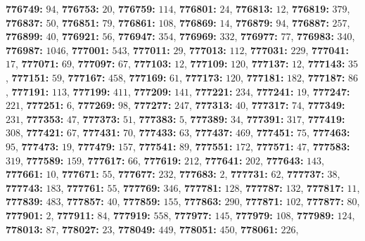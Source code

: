 \textsf{\bfseries 776749:} $94$, \textsf{\bfseries 776753:} $20$, \textsf{\bfseries 776759:} $114$, \textsf{\bfseries 776801:} $24$, \textsf{\bfseries 776813:} $12$, \textsf{\bfseries 776819:} $379$, \textsf{\bfseries 776837:} $50$, \textsf{\bfseries 776851:} $79$, \textsf{\bfseries 776861:} $108$, \textsf{\bfseries 776869:} $14$, \textsf{\bfseries 776879:} $94$, \textsf{\bfseries 776887:} $257$, \textsf{\bfseries 776899:} $40$, \textsf{\bfseries 776921:} $56$, \textsf{\bfseries 776947:} $354$, \textsf{\bfseries 776969:} $332$, \textsf{\bfseries 776977:} $77$, \textsf{\bfseries 776983:} $340$, \textsf{\bfseries 776987:} $1046$, \textsf{\bfseries 777001:} $543$, \textsf{\bfseries 777011:} $29$, \textsf{\bfseries 777013:} $112$, \textsf{\bfseries 777031:} $229$, \textsf{\bfseries 777041:} $17$, \textsf{\bfseries 777071:} $69$, \textsf{\bfseries 777097:} $67$, \textsf{\bfseries 777103:} $12$, \textsf{\bfseries 777109:} $120$, \textsf{\bfseries 777137:} $12$, \textsf{\bfseries 777143:} $35$, \textsf{\bfseries 777151:} $59$, \textsf{\bfseries 777167:} $458$, \textsf{\bfseries 777169:} $61$, \textsf{\bfseries 777173:} $120$, \textsf{\bfseries 777181:} $182$, \textsf{\bfseries 777187:} $86$, \textsf{\bfseries 777191:} $113$, \textsf{\bfseries 777199:} $411$, \textsf{\bfseries 777209:} $141$, \textsf{\bfseries 777221:} $234$, \textsf{\bfseries 777241:} $19$, \textsf{\bfseries 777247:} $221$, \textsf{\bfseries 777251:} $6$, \textsf{\bfseries 777269:} $98$, \textsf{\bfseries 777277:} $247$, \textsf{\bfseries 777313:} $40$, \textsf{\bfseries 777317:} $74$, \textsf{\bfseries 777349:} $231$, \textsf{\bfseries 777353:} $47$, \textsf{\bfseries 777373:} $51$, \textsf{\bfseries 777383:} $5$, \textsf{\bfseries 777389:} $34$, \textsf{\bfseries 777391:} $317$, \textsf{\bfseries 777419:} $308$, \textsf{\bfseries 777421:} $67$, \textsf{\bfseries 777431:} $70$, \textsf{\bfseries 777433:} $63$, \textsf{\bfseries 777437:} $469$, \textsf{\bfseries 777451:} $75$, \textsf{\bfseries 777463:} $95$, \textsf{\bfseries 777473:} $19$, \textsf{\bfseries 777479:} $157$, \textsf{\bfseries 777541:} $89$, \textsf{\bfseries 777551:} $172$, \textsf{\bfseries 777571:} $47$, \textsf{\bfseries 777583:} $319$, \textsf{\bfseries 777589:} $159$, \textsf{\bfseries 777617:} $66$, \textsf{\bfseries 777619:} $212$, \textsf{\bfseries 777641:} $202$, \textsf{\bfseries 777643:} $143$, \textsf{\bfseries 777661:} $10$, \textsf{\bfseries 777671:} $55$, \textsf{\bfseries 777677:} $232$, \textsf{\bfseries 777683:} $2$, \textsf{\bfseries 777731:} $62$, \textsf{\bfseries 777737:} $38$, \textsf{\bfseries 777743:} $183$, \textsf{\bfseries 777761:} $55$, \textsf{\bfseries 777769:} $346$, \textsf{\bfseries 777781:} $128$, \textsf{\bfseries 777787:} $132$, \textsf{\bfseries 777817:} $11$, \textsf{\bfseries 777839:} $483$, \textsf{\bfseries 777857:} $40$, \textsf{\bfseries 777859:} $155$, \textsf{\bfseries 777863:} $290$, \textsf{\bfseries 777871:} $102$, \textsf{\bfseries 777877:} $80$, \textsf{\bfseries 777901:} $2$, \textsf{\bfseries 777911:} $84$, \textsf{\bfseries 777919:} $558$, \textsf{\bfseries 777977:} $145$, \textsf{\bfseries 777979:} $108$, \textsf{\bfseries 777989:} $124$, \textsf{\bfseries 778013:} $87$, \textsf{\bfseries 778027:} $23$, \textsf{\bfseries 778049:} $449$, \textsf{\bfseries 778051:} $450$, \textsf{\bfseries 778061:} $226$, 
